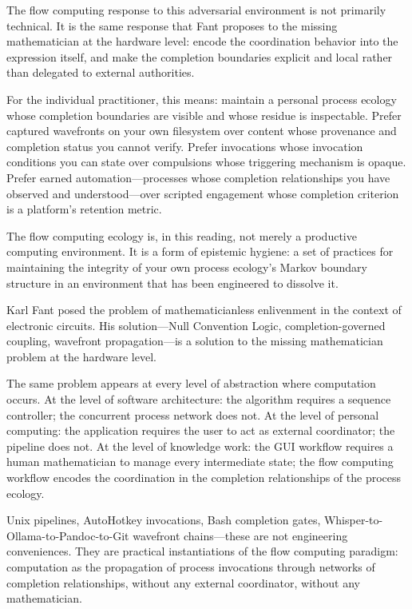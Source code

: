 \documentclass[12pt, a4paper]{article}
\begin{document}
The flow computing response to this adversarial environment is
not primarily technical. It is the same response that Fant
proposes to the missing mathematician at the hardware level:
encode the coordination behavior into the expression itself,
and make the completion boundaries explicit and local rather
than delegated to external authorities.

For the individual practitioner, this means: maintain a personal
process ecology whose completion boundaries are visible and
whose residue is inspectable. Prefer captured wavefronts on
your own filesystem over content whose provenance and completion
status you cannot verify. Prefer invocations whose invocation
conditions you can state over compulsions whose triggering
mechanism is opaque. Prefer earned automation---processes whose
completion relationships you have observed and understood---over
scripted engagement whose completion criterion is a platform's
retention metric.

The flow computing ecology is, in this reading, not merely a
productive computing environment. It is a form of epistemic
hygiene: a set of practices for maintaining the integrity of
your own process ecology's Markov boundary structure in an
environment that has been engineered to dissolve it.

Karl Fant posed the problem of mathematicianless enlivenment in the
context of electronic circuits. His solution---Null Convention Logic,
completion-governed coupling, wavefront propagation---is a solution
to the missing mathematician problem at the hardware level.

The same problem appears at every level of abstraction where
computation occurs. At the level of software architecture: the
algorithm requires a sequence controller; the concurrent process
network does not. At the level of personal computing: the application
requires the user to act as external coordinator; the pipeline does
not. At the level of knowledge work: the GUI workflow requires a
human mathematician to manage every intermediate state; the flow
computing workflow encodes the coordination in the completion
relationships of the process ecology.

Unix pipelines, AutoHotkey invocations, Bash completion gates,
Whisper-to-Ollama-to-Pandoc-to-Git wavefront chains---these are not
engineering conveniences. They are practical instantiations of the
flow computing paradigm: computation as the propagation of process
invocations through networks of completion relationships, without
any external coordinator, without any mathematician.
\end{document}
